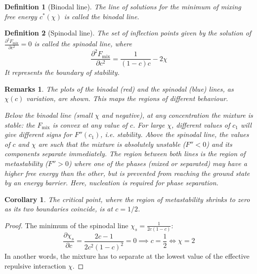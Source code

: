 \documentclass[a4paper]{article}
\newtheorem{remarks}{Remarks}[section]
\theoremstyle{new}
\newtheorem{defi}{Definition}[section]
\newtheorem{cor}{Corollary}[section]
\begin{document}
\begin{defi}[Binodal line]
The line of solutions for the minimum of mixing free energy $c^*(\chi)$ is called the binodal line.
\end{defi}
\begin{defi}[Spinodal line]
The set of inflection points given by the solution of $\frac{\partial^2F_{\text{mix}}}{\partial c^2}=0$ is called the spinodal line, where
$$\frac{\partial^2F_{\text{mix}}}{\partial c^2}=\frac{1}{(1-c)c}-2\chi$$
It represents the boundary of stability.
\end{defi}
\begin{remarks}
The plots of the binodal (red) and the spinodal (blue) lines, as $\chi(c)$ variation, are shown. This maps the regions of different behaviour. 
\begin{center}
\end{center}
Below the binodal line (small $\chi$ and negative), at any concentration the mixture is stable: the $F_{\text{mix}}$ is convex at any value of $c$. For large $\chi$, different values of $c_1$ will give different signs for $F''(c_1)$, i.e. stability. Above the spinodal line, the values of $c$ and $\chi$ are such that the mixture is absolutely unstable ($F''<0$) and its components separate immediately. The region between both lines is the region of metastability ($F''>0$) where one of the phases (mixed or separated) may have a higher free energy than the other, but is prevented from reaching the ground state by an energy barrier. Here, nucleation is required for phase separation.
\end{remarks}
\begin{cor}
The critical point, where the region of metastability shrinks to zero as its two boundaries coincide, is at $c=1/2$.
\end{cor}
\begin{proof}
The minimum of the spinodal line $\chi_s=\frac{1}{2c(1-c)}$:
$$\frac{\partial\chi_s}{\partial c}=\frac{2c-1}{2c^2(1-c)^2}=0\implies c=\frac{1}{2}\iff\chi=2$$
In another words, the mixture has to separate at the lowest value of the effective repulsive interaction $\chi$.
\end{proof}
\end{document}
